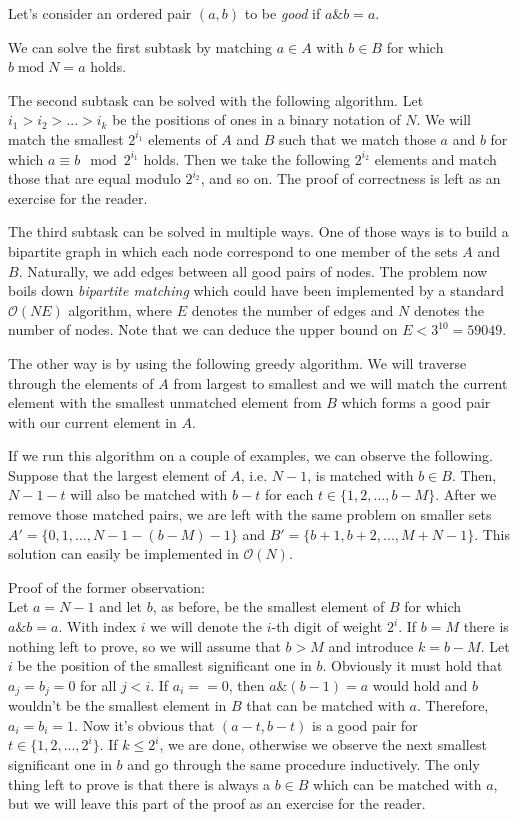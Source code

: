 \documentclass[a4paper]{article}
\begin{document}
Let's consider an ordered pair $(a, b)$ to be \emph{good} if $a \mathbin\& b = a$.

We can solve the first subtask by matching $a \in A$ with $b \in B$ for which
$b \mathbin{\textrm{mod}} N = a$ holds.

The second subtask can be solved with the following algorithm. Let
$i_1 > i_2 > ... > i_k$ be the positions of ones in a binary notation
of $N$. We will match the smallest $2^{i_1}$ elements of $A$ and $B$ such that
we match those $a$ and $b$ for which $a \equiv b \mod 2^{i_1}$ holds. Then we
take the following $2^{i_2}$ elements and match those that are equal modulo
$2^{i_2}$, and so on. The proof of correctness is left as an exercise for the
reader.

The third subtask can be solved in multiple ways. One of those ways is to
build a bipartite graph in which each node correspond to one member of the
sets $A$ and $B$. Naturally, we add edges between all good pairs of nodes. The
problem now boils down \emph{bipartite matching} which could have been
implemented by a standard $\mathcal{O}(NE)$ algorithm, where $E$ denotes the
number of edges and $N$ denotes the number of nodes. Note that we can deduce
the upper bound on $E < 3^{10} = 59049$.

The other way is by using the following greedy algorithm. We will traverse
through the elements of $A$ from largest to smallest and we will match the
current element with the smallest unmatched element from $B$ which forms a
good pair with our current element in $A$.

If we run this algorithm on a couple of examples, we can observe the following.
Suppose that the largest element of $A$, i.e. $N - 1$, is matched with $b \in B$.
Then, $N - 1 - t$ will also be matched with $b - t$ for each
$t \in \{1, 2, ..., b - M\}$. After we remove those matched pairs, we are left
with the same problem on smaller sets $A' = \{0, 1, ..., N - 1 - (b - M) - 1\}$
and $B' = \{b + 1, b + 2, ..., M + N - 1\}$. This solution can easily be
implemented in $\mathcal{O}(N)$.

Proof of the former observation:\\
Let $a = N - 1$ and let $b$, as before, be the smallest element of $B$ for which
$a \mathbin\& b = a$. With index $i$ we will denote the $i$-th digit of weight
$2^i$. If $b = M$ there is nothing left to prove, so we will assume that
$b > M$ and introduce $k = b - M$. Let $i$ be the position of the smallest
significant one in $b$. Obviously it must hold that $a_j = b_j = 0$ for all
$j < i$. If $a_i == 0$, then $a \mathbin\& (b - 1) = a$ would hold and $b$
wouldn't be the smallest element in $B$ that can be matched with $a$. Therefore,
$a_i = b_i = 1$. Now it's obvious that $(a - t, b - t)$ is a good pair for
$t \in \{1, 2, ..., 2^i\}$. If $k \leq 2^i$, we are done, otherwise we observe
the next smallest significant one in $b$ and go through the same procedure
inductively. The only thing left to prove is that there is always a $b \in B$
which can be matched with $a$, but we will leave this part of the proof as
an exercise for the reader.
\end{document}
